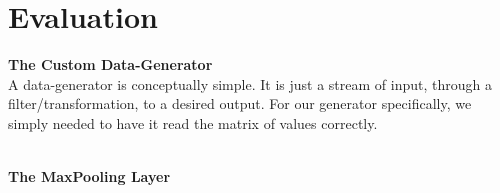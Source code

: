 \section{Evaluation}

\textbf{The Custom Data-Generator}
\\
A data-generator is conceptually simple. It is just a stream of input, through a filter/transformation, to a desired output.
For our generator specifically, we simply needed to have it read the matrix of values correctly.

\\
\textbf{The MaxPooling Layer}
\\
